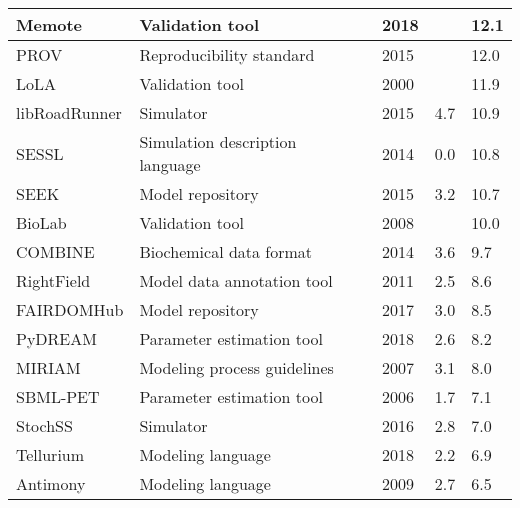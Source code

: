 \begin{longtable}{ |L{2.2cm}|L{5cm}|L{1.2cm}|L{1cm}|R{1.2cm}|R{1cm}| }
\hline
\small{Memote} &\small{Validation tool} &\cite{Lieven2018Memote:Suite} &\small{2018} &\small{} &\small{12.1}\\
\hline
\small{PROV} &\small{Reproducibility standard} &\cite{Moreau2015ThePROV} &\small{2015} &\small{} &\small{12.0}\\
\hline
\small{LoLA} &\small{Validation tool} &\cite{Schmidt2000LoLAAnalyser} &\small{2000} &\small{} &\small{11.9}\\
\hline
\small{libRoadRunner} &\small{Simulator} &\cite{Somogyi2015LibRoadRunner:Library.} &\small{2015} &\small{4.7} &\small{10.9}\\
\hline
\small{SESSL} &\small{Simulation description language} &\cite{Ewald2014SESSL:Experiments} &\small{2014} &\small{0.0} &\small{10.8}\\
\hline
\small{SEEK} &\small{Model repository} &\cite{Wolstencroft2015SEEK:Platform} &\small{2015} &\small{3.2} &\small{10.7}\\
\hline
\small{BioLab} &\small{Validation tool} &\cite{Clarke2008StatisticalPathway} &\small{2008} &\small{} &\small{10.0}\\
\hline
\small{COMBINE} &\small{Biochemical data format} &\cite{Bergmann2014COMBINEProject} &\small{2014} &\small{3.6} &\small{9.7}\\
\hline
\small{RightField} &\small{Model data annotation tool} &\cite{Wolstencroft2011RightField:Spreadsheets} &\small{2011} &\small{2.5} &\small{8.6}\\
\hline
\small{FAIRDOMHub} &\small{Model repository} &\cite{Wolstencroft2017FAIRDOMHub:Research.} &\small{2017} &\small{3.0} &\small{8.5}\\
\hline
\small{PyDREAM} &\small{Parameter estimation tool} &\cite{Shockley2018PyDREAM:Python} &\small{2018} &\small{2.6} &\small{8.2}\\
\hline
\small{MIRIAM} &\small{Modeling process guidelines} &\cite{Laibe2007MIRIAMBiology.} &\small{2007} &\small{3.1} &\small{8.0}\\
\hline
\small{SBML-PET} &\small{Parameter estimation tool} &\cite{Zi2006SBML-PET:Tool} &\small{2006} &\small{1.7} &\small{7.1}\\
\hline
\small{StochSS} &\small{Simulator} &\cite{drawert2016stochastic} &\small{2016} &\small{2.8} &\small{7.0}\\
\hline
\small{Tellurium} &\small{Modeling language} &\cite{Choi2018Tellurium:Biology} &\small{2018} &\small{2.2} &\small{6.9}\\
\hline
\small{Antimony} &\small{Modeling language} &\cite{Smith2009Antimony:Language} &\small{2009} &\small{2.7} &\small{6.5}\\

\end{longtable}
